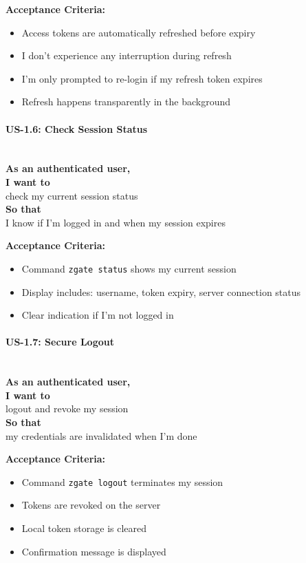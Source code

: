\noindent\textbf{Acceptance Criteria:}
\begin{itemize}
    \item Access tokens are automatically refreshed before expiry
    \item I don't experience any interruption during refresh
    \item I'm only prompted to re-login if my refresh token expires
    \item Refresh happens transparently in the background
\end{itemize}

\paragraph{US-1.6: Check Session Status}
\mbox{}\\[0.5em]

\noindent\textbf{As an authenticated user,} \\
\textbf{I want to} \\
check my current session status \\
\textbf{So that} \\
I know if I'm logged in and when my session expires

\noindent\textbf{Acceptance Criteria:}
\begin{itemize}
    \item Command \texttt{zgate status} shows my current session
    \item Display includes: username, token expiry, server connection status
    \item Clear indication if I'm not logged in
\end{itemize}

\paragraph{US-1.7: Secure Logout}
\mbox{}\\[0.5em]

\noindent\textbf{As an authenticated user,} \\
\textbf{I want to} \\
logout and revoke my session \\
\textbf{So that} \\
my credentials are invalidated when I'm done

\noindent\textbf{Acceptance Criteria:}
\begin{itemize}
    \item Command \texttt{zgate logout} terminates my session
    \item Tokens are revoked on the server
    \item Local token storage is cleared
    \item Confirmation message is displayed
\end{itemize}

